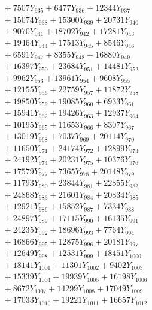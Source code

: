 \documentclass[a4paper,10pt]{article}
\begin{document}
{\begin{align}
&\;  + 7507 Y_{935} + 6477 Y_{936} + 12344 Y_{937} \\[0.3ex]
&\;  + 15074 Y_{938} + 15300 Y_{939} + 20731 Y_{940} \\[0.3ex]
&\;  + 9070 Y_{941} + 18702 Y_{942} + 17281 Y_{943} \\[0.3ex]
&\;  + 19464 Y_{944} + 17513 Y_{945} + 8546 Y_{946} \\[0.3ex]
&\;  + 6591 Y_{947} + 8355 Y_{948} + 16880 Y_{949} \\[0.3ex]
&\;  + 16397 Y_{950} + 23684 Y_{951} + 14481 Y_{952} \\[0.3ex]
&\;  + 9962 Y_{953} + 13961 Y_{954} + 9608 Y_{955} \\[0.3ex]
&\;  + 12155 Y_{956} + 22759 Y_{957} + 11872 Y_{958} \\[0.5ex]\allowbreak
&\;  + 19850 Y_{959} + 19085 Y_{960} + 6933 Y_{961} \\[0.3ex]
&\;  + 15941 Y_{962} + 19426 Y_{963} + 12937 Y_{964} \\[0.3ex]
&\;  + 10195 Y_{965} + 11653 Y_{966} + 8307 Y_{967} \\[0.3ex]
&\;  + 13019 Y_{968} + 7037 Y_{969} + 20114 Y_{970} \\[0.3ex]
&\;  + 11650 Y_{971} + 24174 Y_{972} + 12899 Y_{973} \\[0.3ex]
&\;  + 24192 Y_{974} + 20231 Y_{975} + 10376 Y_{976} \\[0.3ex]
&\;  + 17579 Y_{977} + 7365 Y_{978} + 20148 Y_{979} \\[0.3ex]
&\;  + 11793 Y_{980} + 23844 Y_{981} + 22855 Y_{982} \\[0.3ex]
&\;  + 24868 Y_{983} + 21601 Y_{984} + 20834 Y_{985} \\[0.3ex]
&\;  + 12921 Y_{986} + 15852 Y_{987} + 7334 Y_{988} \\[0.5ex]\allowbreak
&\;  + 24897 Y_{989} + 17115 Y_{990} + 16135 Y_{991} \\[0.3ex]
&\;  + 24235 Y_{992} + 18696 Y_{993} + 7764 Y_{994} \\[0.3ex]
&\;  + 16866 Y_{995} + 12875 Y_{996} + 20181 Y_{997} \\[0.3ex]
&\;  + 12649 Y_{998} + 12531 Y_{999} + 18451 Y_{1000} \\[0.3ex]
&\;  + 18141 Y_{1001} + 11301 Y_{1002} + 9402 Y_{1003} \\[0.3ex]
&\;  + 15339 Y_{1004} + 19939 Y_{1005} + 16198 Y_{1006} \\[0.3ex]
&\;  + 8672 Y_{1007} + 14299 Y_{1008} + 17049 Y_{1009} \\[0.3ex]
&\;  + 17033 Y_{1010} + 19221 Y_{1011} + 16657 Y_{1012} \\[0.3ex]

\end{align}}
\end{document}
